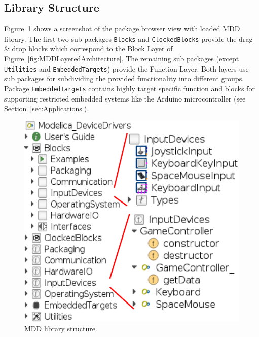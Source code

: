 \documentclass{resources/modelica}
\newcommand{\modelica}[1]{\lstinline[language=modelica]|#1|}
\begin{document}
\subsection{Library Structure}
\label{sec:LibraryStructure}

Figure~\ref{fig:MDDPackageBrowseScreenshot} shows a screenshot of the package
browser view with loaded MDD library. The first two sub packages
\modelica{Blocks} and \modelica{ClockedBlocks} provide the drag \& drop blocks
which correspond to the \textsf{Block Layer} of
Figure~\ref{fig:MDDLayeredArchitecture}. The remaining sub packages (except
\modelica{Utilities} and \modelica{EmbeddedTargets}) provide the
\textsf{Function Layer}.
Both layers use sub packages for subdividing the provided functionality into
different groups. Package \modelica{EmbeddedTargets} contains highly
target specific function and blocks for supporting restricted
embedded systems like the Arduino microcontroller (see
Section~\ref{sec:Applications}).

\begin{figure}[htb]
  \centering
  \includegraphics[width=\columnwidth]{figures/MDDPackageBrowseScreenshot}
  \caption{MDD library structure.}
  \label{fig:MDDPackageBrowseScreenshot}
\end{figure}
\end{document}
